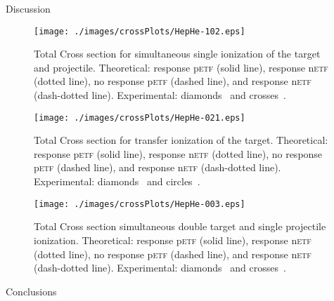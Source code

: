 \documentclass[aps, pra, preprint, groupedaddress, amsfonts,
               amsmath, amssymb, showpacs, nofootinbib]{revtex4-1}
\begin{document}
\begin{section}{Discussion \label{sec:disc}}
   \begin{figure}[htp]
      \centering
      \texttt{[image: ./images/crossPlots/HepHe-102.eps]}
      \caption{Total Cross section for simultaneous single ionization of the target and projectile.
               Theoretical: response p\textsc{etf} (solid line), response n\textsc{etf} (dotted line),
                            no response p\textsc{etf} (dashed line), and response n\textsc{etf}
                            (dash-dotted line).
               Experimental: diamonds~\cite{Dub-89} and crosses~\cite{SSMSM-11}.
 \label{fig:cs102}}
   \end{figure}

   \begin{figure}[htp]
      \centering
      \texttt{[image: ./images/crossPlots/HepHe-021.eps]}
      \caption{Total Cross section for transfer ionization of the target.
               Theoretical: response p\textsc{etf} (solid line), response n\textsc{etf} (dotted line),
                            no response p\textsc{etf} (dashed line), and response n\textsc{etf}
                            (dash-dotted line).
               Experimental: diamonds~\cite{Dub-89} and circles~\cite{FTFHLP-95}.
 \label{fig:cs021}}
   \end{figure}

   \begin{figure}[htp]
      \centering
      \texttt{[image: ./images/crossPlots/HepHe-003.eps]}
      \caption{Total Cross section simultaneous double target and single projectile ionization.
               Theoretical: response p\textsc{etf} (solid line), response n\textsc{etf} (dotted line),
                            no response p\textsc{etf} (dashed line), and response n\textsc{etf}
                            (dash-dotted line).
               Experimental: diamonds~\cite{Dub-89} and crosses~\cite{SSMSM-11}.
 \label{fig:cs003}}
   \end{figure}

\end{section}

\begin{section}{Conclusions \label{sec:conc}}
\end{section}


\end{document}
